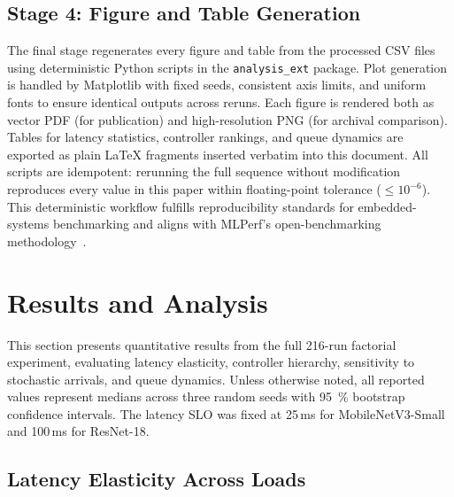\documentclass[acmsmall]{acmart}
\begin{document}
\subsection{Stage 4: Figure and Table Generation}

The final stage regenerates every figure and table from the processed CSV files using deterministic Python scripts in the \texttt{analysis\_ext} package.  
Plot generation is handled by Matplotlib with fixed seeds, consistent axis limits, and uniform fonts to ensure identical outputs across reruns.  
Each figure is rendered both as vector PDF (for publication) and high-resolution PNG (for archival comparison).  
Tables for latency statistics, controller rankings, and queue dynamics are exported as plain \LaTeX{} fragments inserted verbatim into this document.  
All scripts are idempotent: rerunning the full sequence without modification reproduces every value in this paper within floating-point tolerance ($\le10^{-6}$).  
This deterministic workflow fulfills reproducibility standards for embedded-systems benchmarking and aligns with MLPerf’s open-benchmarking methodology~\cite{reddi2020mlperf,banbury2021mlperf}.
\section{Results and Analysis}

This section presents quantitative results from the full 216-run factorial experiment, evaluating latency elasticity, controller hierarchy, sensitivity to stochastic arrivals, and queue dynamics.  
Unless otherwise noted, all reported values represent medians across three random seeds with 95~\% bootstrap confidence intervals.  
The latency SLO was fixed at 25\,ms for MobileNetV3-Small and 100\,ms for ResNet-18.

\subsection{Latency Elasticity Across Loads}
\end{document}
